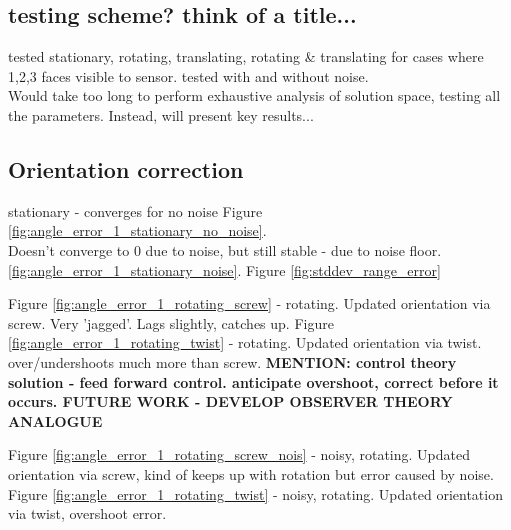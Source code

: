 \subsection{testing scheme? think of a title...}
tested stationary, rotating, translating, rotating \& translating for cases where 1,2,3 faces visible to sensor. tested with and without noise.\\
Would take too long to perform exhaustive analysis of solution space, testing all the parameters. Instead, will present key results...

\subsection{Orientation correction}

stationary - converges for no noise Figure \ref{fig:angle_error_1_stationary_no_noise}.\\
Doesn't converge to 0 due to noise, but still stable - due to noise floor.  \ref{fig:angle_error_1_stationary_noise}. Figure \ref{fig:stddev_range_error}		

Figure \ref{fig:angle_error_1_rotating_screw} - rotating. Updated orientation via screw. Very 'jagged'. Lags slightly, catches up.
Figure \ref{fig:angle_error_1_rotating_twist} - rotating. Updated orientation via twist. over/undershoots much more than screw. \textbf{MENTION: control theory solution - feed forward control. anticipate overshoot, correct before it occurs. FUTURE WORK - DEVELOP OBSERVER THEORY ANALOGUE}

Figure \ref{fig:angle_error_1_rotating_screw_nois} - noisy, rotating. Updated orientation via screw, kind of keeps up with rotation but error caused by noise.
Figure \ref{fig:angle_error_1_rotating_twist} - noisy, rotating. Updated orientation via twist, overshoot error. 

